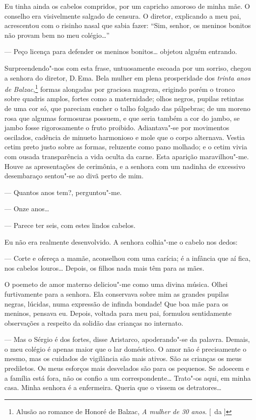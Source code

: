 Eu tinha ainda os cabelos compridos, por um capricho amoroso de minha mãe. O
conselho era visivelmente salgado de censura. O diretor, explicando a
meu pai, acrescentou com o risinho nasal que sabia fazer: ``Sim, senhor,
os meninos bonitos não provam bem no meu colégio\ldots{}'' 

--- Peço licença para defender os meninos bonitos\ldots{} objetou alguém entrando.

Surpreendendo"-nos com esta frase, untuosamente escoada por um
sorriso, chegou a senhora do diretor, D.\,Ema. Bela mulher em plena
prosperidade dos \textit{trinta anos de Balzac},\footnote{ Alusão ao romance de Honoré de Balzac, 
\textit{A mulher de 30 anos}. [~da ]} 
formas alongadas por graciosa magreza, erigindo porém o tronco sobre
quadris amplos, fortes como a maternidade; olhos negros, pupilas
retintas de uma cor só, que pareciam encher o talho folgado das
pálpebras; de um moreno rosa que algumas formosuras possuem, e que
seria também a cor do jambo, se jambo fosse rigorosamente o fruto
proibido. Adiantava"-se por movimentos oscilados, cadência de minueto
harmonioso e mole que o corpo alternava. Vestia cetim preto justo sobre
as formas, reluzente como pano molhado; e o cetim vivia com ousada
transparência a vida oculta da carne. Esta aparição maravilhou"-me.
Houve as apresentações de cerimônia, e a senhora com um nadinha de
excessivo desembaraço sentou"-se ao divã perto de mim. 

--- Quantos anos tem?, perguntou"-me. 

--- Onze anos\ldots{} 

--- Parece ter seis, com estes lindos cabelos. 

Eu não era realmente desenvolvido. A senhora
colhia"-me o cabelo nos dedos: 

--- Corte e ofereça a mamãe, aconselhou
com uma carícia; é a infância que aí fica, nos cabelos louros\ldots{}
Depois, os filhos nada mais têm para as mães. 

O poemeto de amor materno deliciou"-me como uma divina música. Olhei furtivamente 
para a senhora. Ela conservava sobre mim as grandes pupilas negras, lúcidas,
numa expressão de infinda bondade! Que boa mãe para os meninos, pensava
eu. Depois, voltada para meu pai, formulou sentidamente observações a
respeito da solidão das crianças no internato. 

--- Mas o Sérgio é dos fortes, disse Aristarco, apoderando"-se da palavra. 
Demais, o meu colégio é apenas maior que o lar doméstico. O amor não é precisamente o
mesmo, mas os cuidados de vigilância são mais ativos. São as crianças
os meus prediletos. Os meus esforços mais desvelados são para os
pequenos. Se adoecem e a família está fora, não os confio a um
correspondente\ldots{} Trato"-os aqui, em minha casa. Minha senhora é a
enfermeira. Queria que o vissem os detratores\ldots{} 

